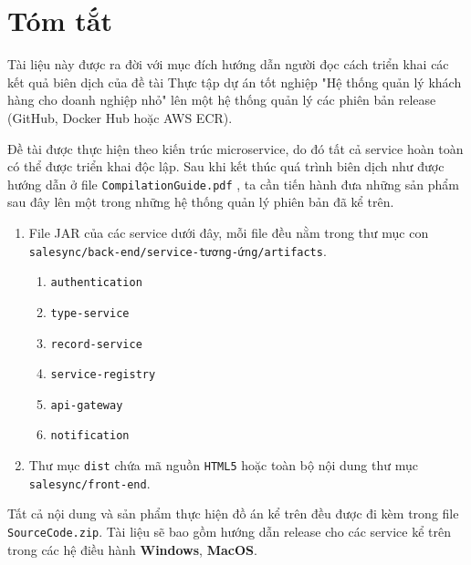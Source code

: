 \chapter*{Tóm tắt}
\label{summary}
Tài liệu này được ra đời với mục đích hướng dẫn người đọc cách triển khai các kết quả biên dịch của đề tài Thực tập dự án tốt nghiệp "Hệ thống quản lý khách hàng cho doanh nghiệp nhỏ" lên một hệ thống quản lý các phiên bản release (GitHub, Docker Hub hoặc AWS ECR).

Đề tài được thực hiện theo kiến trúc microservice, do đó tất cả service hoàn toàn có thể được triển khai độc lập. Sau khi kết thúc quá trình biên dịch như được hướng dẫn ở file  \texttt{CompilationGuide.pdf} , ta cần tiến hành đưa những sản phẩm sau đây lên một trong những hệ thống quản lý phiên bản đã kể trên.
\begin{enumerate}
    \item File JAR của các service dưới đây, mỗi file đều nằm trong thư mục con \texttt{salesync/back-end/service-tương-ứng/artifacts}.
    \begin{enumerate}
        \item \texttt{authentication}
        \item \texttt{type-service}
        \item \texttt{record-service}
        \item \texttt{service-registry}
        \item \texttt{api-gateway}
        \item \texttt{notification}
    \end{enumerate}
    \item Thư mục \texttt{dist} chứa mã nguồn \texttt{HTML5} hoặc toàn bộ nội dung thư mục \texttt{salesync/front-end}.
\end{enumerate}

Tất cả nội dung và sản phẩm thực hiện đồ án kể trên đều được đi kèm trong file \texttt{SourceCode.zip}. Tài liệu sẽ bao gồm hướng dẫn release cho các service kể trên trong các hệ điều hành \textbf{Windows}, \textbf{MacOS}.